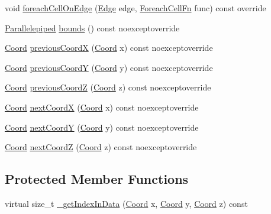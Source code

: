 \begin{DoxyCompactItemize}
\item 
void \hyperlink{class_bound_temperature_world_a48efcef51d61eb752512459e39fecb74}{foreach\-Cell\-On\-Edge} (\hyperlink{_edge_8hpp_a5be7c8fa582f7b873d1c6caacb633073}{Edge} edge, \hyperlink{class_i_temperature_world_boundable_mixin_a370c20d79642d15e97843da972d87ba9}{Foreach\-Cell\-Fn} func) const override
\item 
\hyperlink{struct_parallelepiped}{Parallelepiped} \hyperlink{class_bound_temperature_world_a3351693a7d184365da5dfb5d833a0cb6}{bounds} () const noexceptoverride
\item 
\hyperlink{struct_coord}{Coord} \hyperlink{class_bound_temperature_world_ae85c5e9e19cd5eed8a2961c60ccc4a50}{previous\-Coord\-X} (\hyperlink{struct_coord}{Coord} x) const noexceptoverride
\item 
\hyperlink{struct_coord}{Coord} \hyperlink{class_bound_temperature_world_a48b99d3adb50c8f3093c59c45473fa96}{previous\-Coord\-Y} (\hyperlink{struct_coord}{Coord} y) const noexceptoverride
\item 
\hyperlink{struct_coord}{Coord} \hyperlink{class_bound_temperature_world_a2161f3962f7b12345ad3dfe9952bde90}{previous\-Coord\-Z} (\hyperlink{struct_coord}{Coord} z) const noexceptoverride
\item 
\hyperlink{struct_coord}{Coord} \hyperlink{class_bound_temperature_world_a749eb54a29e4561695454aff9d096ac3}{next\-Coord\-X} (\hyperlink{struct_coord}{Coord} x) const noexceptoverride
\item 
\hyperlink{struct_coord}{Coord} \hyperlink{class_bound_temperature_world_a3470b9dc65cbe1c005b3169a77df1f93}{next\-Coord\-Y} (\hyperlink{struct_coord}{Coord} y) const noexceptoverride
\item 
\hyperlink{struct_coord}{Coord} \hyperlink{class_bound_temperature_world_a3aee760043cb93d5f916da87e2397ff6}{next\-Coord\-Z} (\hyperlink{struct_coord}{Coord} z) const noexceptoverride
\end{DoxyCompactItemize}
\subsection*{Protected Member Functions}
\begin{DoxyCompactItemize}
\item 
virtual size\-\_\-t \hyperlink{class_bound_temperature_world_a6be6a48b1a29f0b1cc4a01b5e0369f9e}{\-\_\-get\-Index\-In\-Data} (\hyperlink{struct_coord}{Coord} x, \hyperlink{struct_coord}{Coord} y, \hyperlink{struct_coord}{Coord} z) const 
\end{DoxyCompactItemize}
